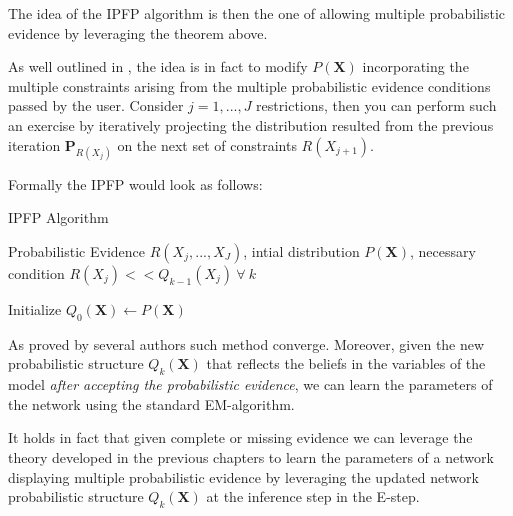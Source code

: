 \documentclass[11pt]{article}
\begin{document}
\begin{article}
The idea of the IPFP algorithm is then the one of allowing multiple
probabilistic evidence by leveraging the theorem above.

As well outlined in \cite{PENG_2010}, the idea is in fact to modify
\(P(\textbf{X})\) incorporating the multiple constraints arising from
the multiple probabilistic evidence conditions passed by the
user. Consider \(j = 1, ..., J\) restrictions, then you can perform
such an exercise by iteratively projecting the distribution
resulted from the previous iteration \(\textbf{P}_{R(X_j)}\) on the
next set of constraints \(R(X_{j+1})\).

Formally the IPFP would look as follows:

\algrenewcommand\algorithmicindent{1.5em}%

\begin{algorithm*}[h!]
\caption{IPFP Algorithm}
\label{alg:IPFP-algorithm}
\vspace{-10pt}
\begin{multicols}{2}
\begin{algorithmic}[1] 
\Require Probabilistic Evidence $R(X_j, ..., X_J)$, intial distribution $P(\textbf{X})$, necessary condition $R(X_j) << Q_{k-1}(X_j) \ \forall \ k$

  \State Initialize $Q_0(\textbf{X}) \leftarrow P(\textbf{X})$
     
  \EndFor
\end{algorithmic}
\end{multicols}
\end{algorithm*}

As proved by several authors such method converge. Moreover, given
the new probabilistic structure \(Q_k(\textbf{X})\) that reflects the
beliefs in the variables of the model \emph{after accepting the
probabilistic evidence}, we can learn the parameters of the network
using the standard EM-algorithm.

It holds in fact that given complete or missing evidence we can
leverage the theory developed in the previous chapters to learn the
parameters of a network displaying multiple probabilistic evidence
by leveraging the updated network probabilistic structure
\(Q_k(\textbf{X})\) at the inference step in the E-step.


\end{article}
\end{document}
